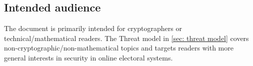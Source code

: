 \subsection{Intended audience}
The document is primarily intended for cryptographers or technical/mathematical readers. The Threat model in \cref{sec: threat model} covers non-cryptographic/non-mathematical topics and targets readers with more general interests in security in online electoral systems.
